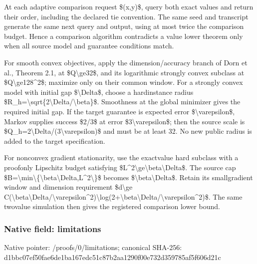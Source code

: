 \documentclass[10pt,a4paper]{article}
\begin{document}
At each adaptive comparison request \$(x,y)\$, query both exact values and return their order, including the declared tie convention. The same seed and transcript generate the same next query and output, using at most twice the comparison budget. Hence a comparison algorithm contradicts a value lower theorem only when all source model and guarantee conditions match.

For smooth convex objectives, apply the dimension/accuracy branch of Dorn et al., Theorem 2.1, at \$Q\textbackslash{}ge32\$, and its logarithmic strongly convex subclass at \$Q\textbackslash{}ge128\textasciicircum{}2\$; maximize only on their common window. For a strongly convex model with initial gap \$\textbackslash{}Delta\$, choose a hardinstance radius \$R\_h=\textbackslash{}sqrt\{2\textbackslash{}Delta/\textbackslash{}beta\}\$. Smoothness at the global minimizer gives the required initial gap. If the target guarantee is expected error \$\textbackslash{}varepsilon\$, Markov supplies success \$2/3\$ at error \$3\textbackslash{}varepsilon\$; then the source scale is \$Q\_h=2\textbackslash{}Delta/(3\textbackslash{}varepsilon)\$ and must be at least 32. No new public radius is added to the target specification.

For nonconvex gradient stationarity, use the exactvalue hard subclass with a proofonly Lipschitz budget satisfying \$L\textasciicircum{}2\textbackslash{}ge\textbackslash{}beta\textbackslash{}Delta\$. The source cap \$B=\textbackslash{}min\textbackslash{}\{\textbackslash{}beta\textbackslash{}Delta,L\textasciicircum{}2\textbackslash{}\}\$ becomes \$\textbackslash{}beta\textbackslash{}Delta\$. Retain its smallgradient window and dimension requirement \$d\textbackslash{}ge C(\textbackslash{}beta\textbackslash{}Delta/\textbackslash{}varepsilo\allowbreak{}n\textasciicircum{}2)\textbackslash{}log(2+\textbackslash{}beta\textbackslash{}Delta/\textbackslash{}\allowbreak{}varepsilon\textasciicircum{}2)\$. The same twovalue simulation then gives the registered comparison lower bound.


\subsubsection{Native field: limitations}


Native pointer: /proofs/0/limitations; canonical SHA-256: d1bbc07ef50fae6de1ba167e\allowbreak{}dc51c87b2aa1290f00e732d3\allowbreak{}59785af5f606d21c
\end{document}
